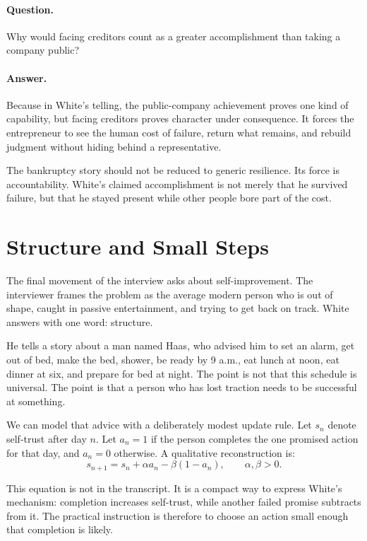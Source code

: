 \paragraph{Question.}
Why would facing creditors count as a greater accomplishment than taking a company public?

\paragraph{Answer.}
Because in White's telling, the public-company achievement proves one kind of capability, but facing creditors proves character under consequence. It forces the entrepreneur to see the human cost of failure, return what remains, and rebuild judgment without hiding behind a representative.

\begin{remark}
The bankruptcy story should not be reduced to generic resilience. Its force is accountability. White's claimed accomplishment is not merely that he survived failure, but that he stayed present while other people bore part of the cost.
\end{remark}

\section{Structure and Small Steps}

The final movement of the interview asks about self-improvement. The interviewer frames the problem as the average modern person who is out of shape, caught in passive entertainment, and trying to get back on track. White answers with one word: structure.

He tells a story about a man named Haas, who advised him to set an alarm, get out of bed, make the bed, shower, be ready by 9 a.m., eat lunch at noon, eat dinner at six, and prepare for bed at night. The point is not that this schedule is universal. The point is that a person who has lost traction needs to be successful at something.

We can model that advice with a deliberately modest update rule. Let \(s_n\) denote self-trust after day \(n\). Let \(a_n=1\) if the person completes the one promised action for that day, and \(a_n=0\) otherwise. A qualitative reconstruction is:
\begin{equation}
s_{n+1}=s_n+\alpha a_n-\beta(1-a_n),
\qquad \alpha,\beta>0.
\end{equation}

This equation is not in the transcript. It is a compact way to express White's mechanism: completion increases self-trust, while another failed promise subtracts from it. The practical instruction is therefore to choose an action small enough that completion is likely.

